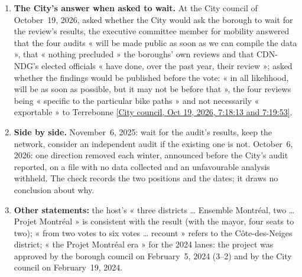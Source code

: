 \documentclass[10pt,letterpaper]{article}
\newcommand{\repourl}{https://github.com/OpenMobilityData/Terrebonne-open-sources}
\newcommand{\tr}[1]{\href{\repourl/blob/main/2026-10-19-city-council/2026-10-19_03.md}{\textsf{\small[City council, Oct 19, 2026, #1]}}}
\begin{document}
\begin{enumerate}[nosep,itemsep=0.3em,leftmargin=1.4em]
\item \textbf{The City's answer when asked to wait.} At the City council of October~19, 2026, asked whether the City would ask the borough to wait for the review's results, the executive committee member for mobility answered that the four audits « will be made public as soon as we can compile the data », that « nothing precluded » the boroughs' own reviews and that CDN-NDG's elected officials « have done, over the past year, their review »; asked whether the findings would be published before the vote: « in all likelihood, will be as soon as possible, but it may not be before that », the four reviews being « specific to the particular bike paths » and not necessarily « exportable » to Terrebonne \tr{7:18:13 and 7:19:53}.
\item \textbf{Side by side.} November~6, 2025: wait for the audit's results, keep the network, consider an independent audit if the existing one is not. October~6, 2026: one direction removed each winter, announced before the City's audit reported, on a file with no data collected and an unfavourable analysis withheld. The check records the two positions and the dates; it draws no conclusion about why.
\item \textbf{Other statements:} the host's « three districts … Ensemble Montréal, two … Projet Montréal » is consistent with the result (with the mayor, four seats to two); « from two votes to six votes … recount » refers to the Côte-des-Neiges district; « the Projet Montréal era » for the 2024 lanes: the project was approved by the borough council on February~5, 2024 (3--2) and by the City council on February~19, 2024.
\end{enumerate}
\end{document}
